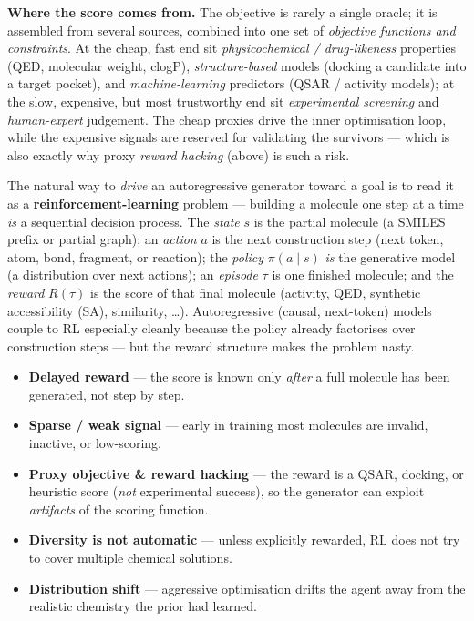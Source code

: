 \documentclass[11pt, oneside]{book}
\begin{document}
\medskip
\noindent\textbf{Where the score comes from.} The objective is rarely a single oracle;
it is assembled from several sources, combined into one set of \emph{objective functions
and constraints}. At the cheap, fast end sit \emph{physicochemical / drug-likeness}
properties (QED, molecular weight, clogP), \emph{structure-based} models (docking a
candidate into a target pocket), and \emph{machine-learning} predictors (QSAR / activity
models); at the slow, expensive, but most trustworthy end sit \emph{experimental
screening} and \emph{human-expert} judgement. The cheap proxies drive the inner
optimisation loop, while the expensive signals are reserved for validating the
survivors --- which is also exactly why proxy \emph{reward hacking} (above) is such a
risk.

The natural way to \emph{drive} an autoregressive generator toward a goal is to read
it as a \textbf{reinforcement-learning} problem --- building a molecule one step at a
time \emph{is} a sequential decision process. The \emph{state} $s$ is the partial
molecule (a SMILES prefix or partial graph); an \emph{action} $a$ is the next
construction step (next token, atom, bond, fragment, or reaction); the \emph{policy}
$\pi(a\mid s)$ \emph{is} the generative model (a distribution over next actions); an
\emph{episode} $\tau$ is one finished molecule; and the \emph{reward} $R(\tau)$ is the
score of that final molecule (activity, QED, synthetic accessibility (SA),
similarity, \dots). Autoregressive
(causal, next-token) models couple to RL especially cleanly because the policy already
factorises over construction steps --- but the reward structure makes the problem nasty.

\begin{starbox}[title={\ensuremath{\bigstar}\, Why molecular RL is hard}]
\begin{itemize}
  \item \textbf{Delayed reward} --- the score is known only \emph{after} a full
        molecule has been generated, not step by step.
  \item \textbf{Sparse / weak signal} --- early in training most molecules are
        invalid, inactive, or low-scoring.
  \item \textbf{Proxy objective \& reward hacking} --- the reward is a QSAR, docking,
        or heuristic score (\emph{not} experimental success), so the generator can
        exploit \emph{artifacts} of the scoring function.
  \item \textbf{Diversity is not automatic} --- unless explicitly rewarded, RL does
        not try to cover multiple chemical solutions.
  \item \textbf{Distribution shift} --- aggressive optimisation drifts the agent away
        from the realistic chemistry the prior had learned.
\end{itemize}
\end{starbox}
\end{document}
